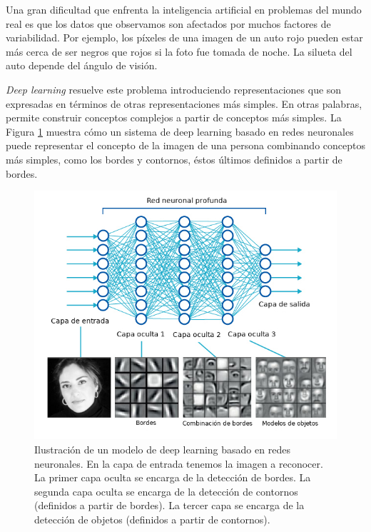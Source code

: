 \documentclass[spanish]{report}
\begin{document}
Una gran dificultad que enfrenta la inteligencia artificial en problemas del mundo real es que los datos que observamos son afectados por muchos factores de variabilidad. Por ejemplo, los píxeles de una imagen de un auto rojo pueden estar más cerca de ser negros que rojos si la foto fue tomada de noche. La silueta del auto depende del ángulo de visión. 

\textit{Deep learning} \cite{deep_learning_book} resuelve este problema introduciendo representaciones que son expresadas en términos de otras representaciones más simples. En otras palabras, permite construir conceptos complejos a partir de conceptos más simples. La Figura \ref{fig:deep_learning_ex} muestra cómo un sistema de deep learning basado en redes neuronales puede representar el concepto de la imagen de una persona combinando conceptos más simples, como los bordes y contornos, éstos últimos definidos a partir de bordes.

\begin{figure}[h]
\centering
 \includegraphics[width=\linewidth]{deep_learning_ex.jpg}
   \caption[Ilustración de un modelo de deep learning basado en redes neuronales. En la capa de entrada tenemos la imagen a reconocer. La primer capa oculta se encarga de la detección de bordes. La segunda capa oculta se encarga de la detección de contornos (definidos a partir de bordes). La tercer capa se encarga de la detección de objetos (definidos a partir de contornos).]{Ilustración de un modelo de deep learning basado en redes neuronales. En la capa de entrada tenemos la imagen a reconocer. La primer capa oculta se encarga de la detección de bordes. La segunda capa oculta se encarga de la detección de contornos (definidos a partir de bordes). La tercer capa se encarga de la detección de objetos (definidos a partir de contornos). \protect\footnotemark}
  \label{fig:deep_learning_ex}
\end{figure}
\end{document}
